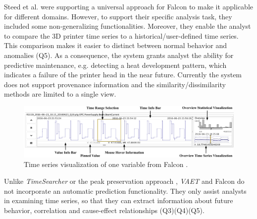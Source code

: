 \documentclass[electronic]{vgtc}             %
\begin{document}
Steed et al. were supporting a universal approach for Falcon to make it applicable for different domains. 
However, to support their specific analysis task, they included some non-generalizing functionalities. 
Moreover, they enable the analyst to compare the 3D printer time series to a historical/user-defined time series. 
This comparison makes it easier to distinct between normal behavior and anomalies (Q5). 
As a consequence, the system grants analyst the ability for predictive maintenance, e.g. detecting a heat development pattern, which indicates a failure of the printer head in the near future. 
Currently the system does not support provenance information and the similarity/dissimilarity methods are limited to a single view.

\begin{figure}[t]
	\centering
	\includegraphics[width=\columnwidth]{Falcon}
	\caption{Time series visualization of one variable from Falcon \cite{steed:2017}.
	}
	\label{fig:falcon}
\end{figure}

Unlike \textit{TimeSearcher} \cite{buono:2007} or the peak preservation approach \cite{Hao:2012}, \textit{VAET} \cite{Xie:2014} and Falcon \cite{steed:2017} do not incorporate an automatic prediction functionality.
They only assist analysts in examining time series, so that they can extract information about future behavior, correlation and cause-effect relationships  (Q3)(Q4)(Q5). 
\end{document}
